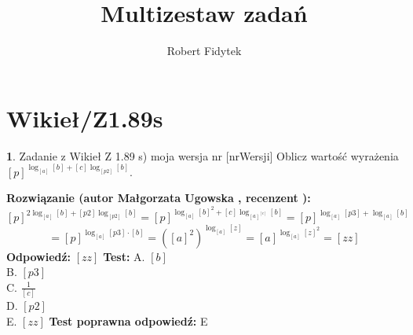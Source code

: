 \documentclass[12pt, a4paper]{article}
\title{Multizestaw zadań}
\author{Robert Fidytek}
\date{}
\theoremstyle{definition} %
\newtheorem{zad}{}
\newcommand{\kategoria}[1]{\section{#1}} %
\newcommand{\zadStart}[1]{\begin{zad}#1\newline} %
\newcommand{\zadStop}{\end{zad}}   %
\newcommand{\rozwStart}[2]{\noindent \textbf{Rozwiązanie (autor #1 , recenzent #2): }\newline} %
\newcommand{\rozwStop}{\newline}                                            %
\newcommand{\odpStart}{\noindent \textbf{Odpowiedź:}\newline}    %
\newcommand{\odpStop}{\newline}                                             %
\newcommand{\testStart}{\noindent \textbf{Test:}\newline} %
\newcommand{\testStop}{\newline} %
\newcommand{\kluczStart}{\noindent \textbf{Test poprawna odpowiedź:}\newline} %
\newcommand{\kluczStop}{\newline} %
\begin{document}
\maketitle


\kategoria{Wikieł/Z1.89s}
\zadStart{Zadanie z Wikieł Z 1.89 s) moja wersja nr [nrWersji]}
Oblicz warto\'sć wyrażenia $[p]^{\log_{[a]}{[b]}+ [c] \log_{[p2]}{[b]}}$.
\zadStop
\rozwStart{Małgorzata Ugowska}{}
$$[p]^{2\log_{[a]}{[b]}+ [p2] \log_{[p2]}{[b]}}= [p]^{\log_{[a]}{[b]^2}+ [c] \log_{[a]^{[c]}}{[b]}} = [p]^{\log_{[a]}{[p3]}+ \log_{[a]}{[b]}}$$ 
$$=[p]^{\log_{[a]}{[p3]\cdot [b]}} = ([a]^{2})^{\log_{[a]}{[z]}} = [a]^{\log_{[a]}{{[z]}^2}} = [zz] $$
\rozwStop
\odpStart
$[zz]$
\odpStop
\testStart
A. $[b]$\\
B. $[p3]$\\
C. $\frac{1}{[c]}$\\
D. $[p2]$\\
E. $[zz]$
\testStop
\kluczStart
E
\kluczStop
\end{document}
